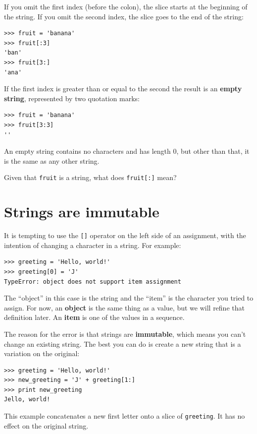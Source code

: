 \documentclass[10pt]{book}
\begin{document}
\begin{CJK}{UTF8}{gbsn}
If you omit the first index (before the colon), the slice starts at
the beginning of the string.  If you omit the second index, the slice
goes to the end of the string:

\begin{verbatim}
>>> fruit = 'banana'
>>> fruit[:3]
'ban'
>>> fruit[3:]
'ana'
\end{verbatim}
%
If the first index is greater than or equal to the second the result
is an {\bf empty string}, represented by two quotation marks:

\begin{verbatim}
>>> fruit = 'banana'
>>> fruit[3:3]
''
\end{verbatim}
%
An empty string contains no characters and has length 0, but other
than that, it is the same as any other string.

\begin{exercise}

Given that {\tt fruit} is a string, what does
{\tt fruit[:]} mean?

\end{exercise}


\section{Strings are immutable}

It is tempting to use the {\tt []} operator on the left side of an
assignment, with the intention of changing a character in a string.
For example:

\begin{verbatim}
>>> greeting = 'Hello, world!'
>>> greeting[0] = 'J'
TypeError: object does not support item assignment
\end{verbatim}
%
The ``object'' in this case is the string and the ``item'' is
the character you tried to assign.  For now, an {\bf object} is
the same thing as a value, but we will refine that definition
later.  An {\bf item} is one of the values in a sequence.

The reason for the error is that
strings are {\bf immutable}, which means you can't change an
existing string.  The best you can do is create a new string
that is a variation on the original:

\begin{verbatim}
>>> greeting = 'Hello, world!'
>>> new_greeting = 'J' + greeting[1:]
>>> print new_greeting
Jello, world!
\end{verbatim}
%
This example concatenates a new first letter onto
a slice of {\tt greeting}.  It has no effect on
the original string.



\end{CJK}
\end{document}
